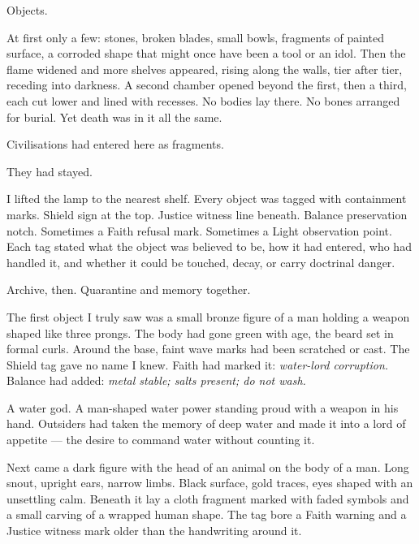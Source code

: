 Objects.\par

At first only a few: stones, broken blades, small bowls, fragments of painted surface, a corroded shape that might once have been a tool or an idol. Then the flame widened and more shelves appeared, rising along the walls, tier after tier, receding into darkness. A second chamber opened beyond the first, then a third, each cut lower and lined with recesses. No bodies lay there. No bones arranged for burial. Yet death was in it all the same.\par

Civilisations had entered here as fragments.\par

They had stayed.\par

I lifted the lamp to the nearest shelf. Every object was tagged with containment marks. Shield sign at the top. Justice witness line beneath. Balance preservation notch. Sometimes a Faith refusal mark. Sometimes a Light observation point. Each tag stated what the object was believed to be, how it had entered, who had handled it, and whether it could be touched, decay, or carry doctrinal danger.\par

Archive, then. Quarantine and memory together.\par

The first object I truly saw was a small bronze figure of a man holding a weapon shaped like three prongs. The body had gone green with age, the beard set in formal curls. Around the base, faint wave marks had been scratched or cast. The Shield tag gave no name I knew. Faith had marked it: \textit{water-lord corruption.} Balance had added: \textit{metal stable; salts present; do not wash.}\par

A water god. A man-shaped water power standing proud with a weapon in his hand. Outsiders had taken the memory of deep water and made it into a lord of appetite --- the desire to command water without counting it.\par

Next came a dark figure with the head of an animal on the body of a man. Long snout, upright ears, narrow limbs. Black surface, gold traces, eyes shaped with an unsettling calm. Beneath it lay a cloth fragment marked with faded symbols and a small carving of a wrapped human shape. The tag bore a Faith warning and a Justice witness mark older than the handwriting around it.\par

